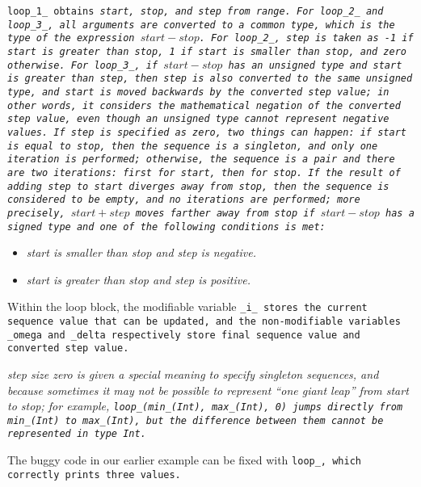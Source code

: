 \tt{loop_1_} obtains \it{start}, \it{stop}, and \it{step} from \it{range}.
For \tt{loop_2_} and \tt{loop_3_}, all arguments are converted to a common type,
which is the type of the expression $start - stop$.
For \tt{loop_2_}, \it{step} is taken as -1 if \it{start} is greater than
\it{stop}, 1 if \it{start} is smaller than \it{stop}, and zero otherwise.
For \tt{loop_3_}, if $start - stop$ has an unsigned type and \it{start} is
greater than \it{step}, then \it{step} is also converted to the same unsigned
type, and \it{start} is moved backwards by the converted step value;
in other words, it considers the mathematical negation of the converted
step value, even though an unsigned type cannot represent negative values.
If \it{step} is specified as zero, two things can happen:
if \it{start} is equal to \it{stop}, then the sequence is a singleton,
and only one iteration is performed; otherwise, the sequence is a pair
and there are two iterations: first for \it{start}, then for \it{stop}.
If the result of adding \it{step} to \it{start} diverges away from \it{stop},
then the sequence is considered to be empty, and no iterations are performed;
more precisely, $start + step$ moves farther away from \it{stop} if
$start - stop$ has a signed type and one of the following conditions is met:

\begin{itemize}[nosep]
\item \it{start} is smaller than \it{stop} and \it{step} is negative.
\item \it{start} is greater than \it{stop} and \it{step} is positive.
\end{itemize}

Within the loop block, the modifiable variable \tt{_i_} stores the current
sequence value that can be updated, and the non-modifiable variables \tt{_omega}
and \tt{_delta} respectively store final sequence value and converted step value.

\pagebreak

\note \it{step} size zero is given a special meaning to specify singleton
sequences, and because sometimes it may not be possible to represent ``one
giant leap'' from \it{start} to \it{stop}; for example, \tt{loop_(min_(Int),
max_(Int), 0)} jumps directly from \tt{min_(Int)} to \tt{max_(Int)},
but the difference between them cannot be represented in type \tt{Int}.

\example The buggy code in our earlier example can be
fixed with \tt{loop_}, which correctly prints three values.

